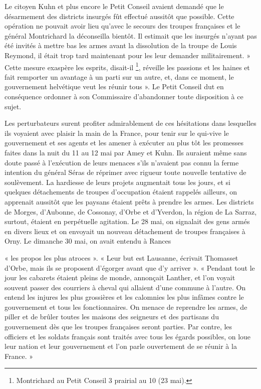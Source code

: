 \documentclass[french,twoside]{book} %
\newenvironment{quoteblock}%
  {\begin{quoting}}
  {\end{quoting}}
\newenvironment{quotebar}{%
    \def\FrameCommand{{\color{rubric!10!}\vrule width 0.5em} \hspace{0.9em}}%
    \def\OuterFrameSep{\itemsep} %
    \MakeFramed {\advance\hsize-\width \FrameRestore}
  }%
  {%
    \endMakeFramed
  }
\renewenvironment{quoteblock}%
  {%
    \savenotes
    \setstretch{0.9}
    \begin{quotebar}
  }
  {%
    \end{quotebar}
    \spewnotes
  }
\begin{document}
\noindent Le citoyen Kuhn et plus encore le Petit Conseil avaient demandé que le désarmement des districts insurgés fût effectué aussitôt que possible. Cette opération ne pouvait avoir lieu qu’avec le secours des troupes françaises et le général Montrichard la déconseilla bientôt. Il estimait que les insurgés n’ayant pas été invités à mettre bas les armes avant la dissolution de la troupe de Louis Reymond, il était trop tard maintenant pour les leur demander militairement. » Cette mesure exaspère les esprits, disait-il \footnote{Montrichard au Petit Conseil 3 prairial au 10 (23 mai).}, réveille les passions et les haines et fait remporter un avantage à un parti sur un autre, et, dans ce moment, le gouvernement helvétique veut les réunir tous ». Le Petit Conseil dut en conséquence ordonner à son Commissaire d’abandonner toute disposition à ce sujet.\par
Les perturbateurs surent profiter admirablement de ces hésitations dans lesquelles ils voyaient avec plaisir la main de la France, pour tenir sur le qui-vive le gouvernement et ses agents et les amener à exécuter au plus tôt les promesses faites dans la nuit du 11 au 12 mai par Amey et Kuhn. Ils auraient même sans doute passé à l’exécution de leurs menaces s’ils n’avaient pas connu la ferme intention du général Séras de réprimer avec rigueur toute nouvelle tentative de soulèvement. La hardiesse de leurs projets augmentait tous les jours, et si quelques détachements de troupes d’occupation étaient rappelés ailleurs, on apprenait aussitôt que les paysans étaient prêts à prendre les armes. Les districts de Morges, d’Aubonne, de Cossonay, d’Orbe et d’Yverdon, la région de La Sarraz, surtout, étaient en perpétuelle agitation. Le 28 mai, on signalait des gens armés en divers lieux et on envoyait un nouveau détachement de troupes françaises à Orny. Le dimanche 30 mai, on avait entendu à Rances\par

\begin{quoteblock}
 \noindent « les propos les plus atroces ». « Leur but est Lausanne, écrivait Thomasset d’Orbe, mais ils se proposent d’égorger avant que d’y arriver ». « Pendant tout le jour les cabarets étaient pleins de monde, annonçait Lanther, et l’on voyait souvent passer des courriers à cheval qui allaient d’une commune à l’autre. On entend les injures les plus grossières et les calomnies les plus infâmes contre le gouvernement et tous les fonctionnaires. On menace de reprendre les armes, de piller et de brûler toutes les maisons des seigneurs et des partisans du gouvernement dès que les troupes françaises seront parties. Par contre, les officiers et les soldats français sont traités avec tous les égards possibles, on loue leur nation et leur gouvernement et l’on parle ouvertement de se réunir à la France. »
 \end{quoteblock}
\end{document}
